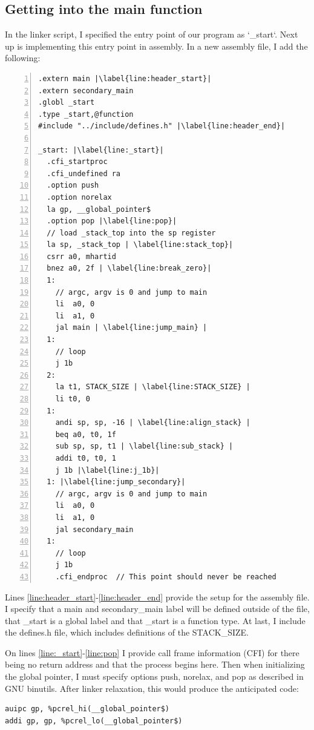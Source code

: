 \subsection{Getting into the main function}\label{sec:get_main}
In the linker script, I specified the entry point of our program as `\_start`.
Next up is implementing this entry point in assembly. In a new assembly file, I
add the following:
\begin{lstlisting}[numbers=left, escapechar=|, caption=Assembly code for getting
to main function.]
.extern main |\label{line:header_start}|
.extern secondary_main
.globl _start
.type _start,@function
#include "../include/defines.h" |\label{line:header_end}|

_start: |\label{line:_start}|
  .cfi_startproc
  .cfi_undefined ra
  .option push
  .option norelax
  la gp, __global_pointer$
  .option pop |\label{line:pop}|
  // load _stack_top into the sp register
  la sp, _stack_top | \label{line:stack_top}|
  csrr a0, mhartid
  bnez a0, 2f | \label{line:break_zero}|
  1:
    // argc, argv is 0 and jump to main
    li  a0, 0
    li  a1, 0
    jal main | \label{line:jump_main} |
  1:
    // loop
    j 1b
  2:
    la t1, STACK_SIZE | \label{line:STACK_SIZE} |
    li t0, 0
  1:
    andi sp, sp, -16 | \label{line:align_stack} |
    beq a0, t0, 1f
    sub sp, sp, t1 | \label{line:sub_stack} |
    addi t0, t0, 1
    j 1b |\label{line:j_1b}|
  1: |\label{line:jump_secondary}|
    // argc, argv is 0 and jump to main
    li  a0, 0
    li  a1, 0
    jal secondary_main
  1:
    // loop
    j 1b
    .cfi_endproc  // This point should never be reached
\end{lstlisting}
Lines \ref{line:header_start}-\ref{line:header_end} provide the setup for the
assembly file. I specify that a main and secondary\_main label will be defined
outside of the file, that \_start is a global label and that \_start is a
function type. At last, I include the defines.h file, which includes
definitions of the STACK\_SIZE.

On lines \ref{line:_start}-\ref{line:pop} I provide call frame information
(CFI) for there being no return address and that the process begins here. Then
when initializing the global pointer, I must specify options push, norelax, and
pop as described in GNU binutils. \cite{GNU_bin} After linker relaxation, this
would produce the anticipated code:
\begin{lstlisting}
auipc gp, %pcrel_hi(__global_pointer$)
addi gp, gp, %pcrel_lo(__global_pointer$)
\end{lstlisting}

